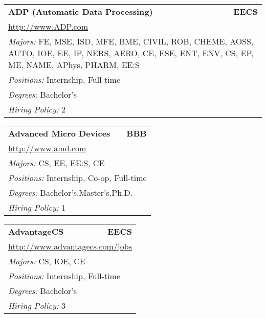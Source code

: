 \documentclass[twoside]{article}
\begin{document}
\begin{center}
\begin{multicols}{3}
\begin{FlushLeft}
\begin{minipage}{\columnwidth}\begin{tabularx}{.95\columnwidth}{Xr}
                 {\Large\bf ADP (Automatic Data Processing)} & {\Large\bf EECS}\\
    \multicolumn{2}{p{.95\columnwidth}}{\url{http://www.ADP.com}}\\
    \multicolumn{2}{p{.95\columnwidth}}{\emph{Majors:} FE, MSE, ISD, MFE, BME, CIVIL, ROB, CHEME, AOSS, AUTO, IOE, EE, IP, NERS, AERO, CE, ESE, ENT, ENV, CS, EP, ME, NAME, APhys, PHARM, EE:S}\\
    \multicolumn{2}{p{.95\columnwidth}}{\emph{Positions:} Internship, Full-time}\\
    \multicolumn{2}{p{.95\columnwidth}}{\emph{Degrees:} Bachelor's}\\
    \multicolumn{2}{p{.95\columnwidth}}{\emph{Hiring Policy:} 2}\\
    \end{tabularx}
    
\end{minipage}
 
\begin{minipage}{\columnwidth}\begin{tabularx}{.95\columnwidth}{Xr}
                 {\Large\bf Advanced Micro Devices} & {\Large\bf BBB}\\
    \multicolumn{2}{p{.95\columnwidth}}{\url{http://www.amd.com}}\\
    \multicolumn{2}{p{.95\columnwidth}}{\emph{Majors:} CS, EE, EE:S, CE}\\
    \multicolumn{2}{p{.95\columnwidth}}{\emph{Positions:} Internship, Co-op, Full-time}\\
    \multicolumn{2}{p{.95\columnwidth}}{\emph{Degrees:} Bachelor's,Master's,Ph.D.}\\
    \multicolumn{2}{p{.95\columnwidth}}{\emph{Hiring Policy:} 1}\\
    \end{tabularx}
    
\end{minipage}
 
\begin{minipage}{\columnwidth}\begin{tabularx}{.95\columnwidth}{Xr}
                 {\Large\bf AdvantageCS} & {\Large\bf EECS}\\
    \multicolumn{2}{p{.95\columnwidth}}{\url{http://www.advantagecs.com/jobs}}\\
    \multicolumn{2}{p{.95\columnwidth}}{\emph{Majors:} CS, IOE, CE}\\
    \multicolumn{2}{p{.95\columnwidth}}{\emph{Positions:} Internship, Full-time}\\
    \multicolumn{2}{p{.95\columnwidth}}{\emph{Degrees:} Bachelor's}\\
    \multicolumn{2}{p{.95\columnwidth}}{\emph{Hiring Policy:} 3}\\
    \end{tabularx}
    

\end{minipage}
\end{FlushLeft}
\end{multicols}
\end{center}
\end{document}

